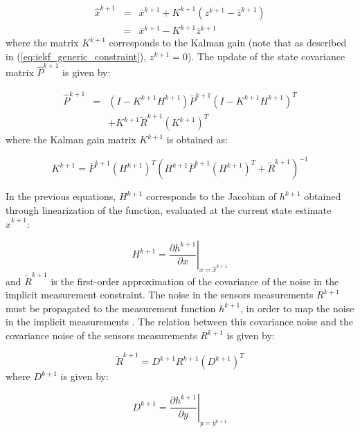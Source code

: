 \begin{equation}
\begin{array}{ccc}
\hat{x}^{k+1} & = & \bar{x}^{k+1}+K^{k+1}\left(z^{k+1}-\bar{z}^{k+1}\right)\\
 & = & \bar{x}^{k+1}-K^{k+1}\bar{z}^{k+1}\end{array}
\end{equation}
where the matrix $K^{k+1}$ corresponds to the Kalman gain (note that as described in (\ref{eq:iekf_generic_constraint}), $z^{k+1}=0$). The update of the state covariance matrix $\hat{P}^{k+1}$ is given by:

\begin{equation}
\begin{array}{ccc}
\hat{P}^{k+1} & = & \left(I-K^{k+1}H^{k+1}\right)\bar{P}^{k+1}\left(I-K^{k+1}H^{k+1}\right)^{T}\\
 &  & +K^{k+1}\tilde{R}^{k+1}\left(K^{k+1}\right)^{T}\end{array}
\end{equation}
where the Kalman gain matrix $K^{k+1}$ is obtained as:

\begin{equation}
K^{k+1}=\bar{P}^{k+1}(H^{k+1})^T\left(H^{k+1}\bar{P}^{k+1}\left(H^{k+1}\right)^{T}+\tilde{R}^{k+1}\right)^{-1}
\label{eq:kalman_gain}
\end{equation}

In the previous equations, $H^{k+1}$ corresponds to the Jacobian of $h^{k+1}$ obtained through linearization of the function, evaluated at the current state estimate $\hat{x}^{k+1}$:

\begin{equation}
H^{k+1}=\left.\frac{\partial h^{k+1}}{\partial x}\right|_{x=\hat{x}^{k+1}}
\end{equation}
and $\tilde{R}^{k+1}$ is the first-order approximation of the covariance of the noise in the implicit measurement constraint. The noise in the sensors measurements $R^{k+1}$ must be propagated to the measurement function $h^{k+1}$, in order to map the noise in the implicit measurements \cite{Soatto96}. The relation between this covariance noise and the covariance noise of the sensors measurements $R^{k+1}$ is given by:

\begin{equation}
\tilde{R}^{k+1}=D^{k+1}R^{k+1}\left(D^{k+1}\right)^{T}
\label{eq:implicit_measurements_cov}
\end{equation}
where $D^{k+1}$ is given by:

\begin{equation}
D^{k+1}=\left.\frac{\partial h^{k+1}}{\partial y}\right|_{y=y^{k+1}}
\end{equation}

